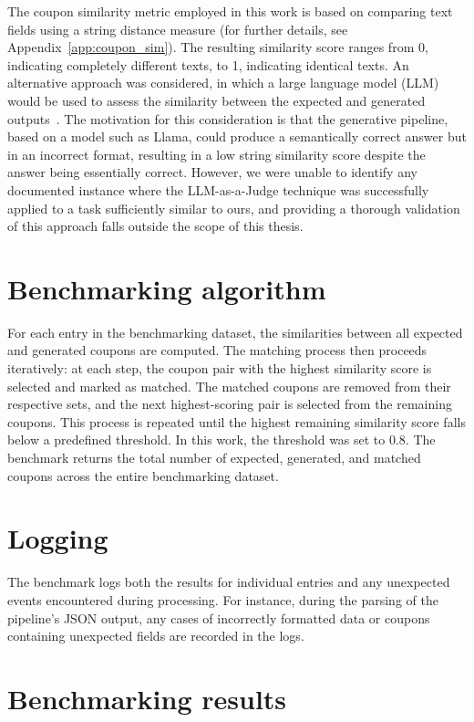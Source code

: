 \documentclass[licencjacka,en]{pracamgr}
\begin{document}
The coupon similarity metric employed in this work is based on comparing text fields using a string distance measure (for further details, see Appendix~\ref{app:coupon_sim}). The resulting similarity score ranges from 0, indicating completely different texts, to 1, indicating identical texts. An alternative approach was considered, in which a large language model (LLM) would be used to assess the similarity between the expected and generated outputs~\cite{llm-as-a-judge}. The motivation for this consideration is that the generative pipeline, based on a model such as Llama, could produce a semantically correct answer but in an incorrect format, resulting in a low string similarity score despite the answer being essentially correct. However, we were unable to identify any documented instance where the LLM-as-a-Judge technique was successfully applied to a task sufficiently similar to ours, and providing a thorough validation of this approach falls outside the scope of this thesis.

\section{Benchmarking algorithm}

For each entry in the benchmarking dataset, the similarities between all expected and generated coupons are computed. The matching process then proceeds iteratively: at each step, the coupon pair with the highest similarity score is selected and marked as matched. The matched coupons are removed from their respective sets, and the next highest-scoring pair is selected from the remaining coupons. This process is repeated until the highest remaining similarity score falls below a predefined threshold. In this work, the threshold was set to 0.8. The benchmark returns the total number of expected, generated, and matched coupons across the entire benchmarking dataset.

\section{Logging}

The benchmark logs both the results for individual entries and any unexpected events encountered during processing. For instance, during the parsing of the pipeline’s JSON output, any cases of incorrectly formatted data or coupons containing unexpected fields are recorded in the logs.

\section{Benchmarking results} \label{benchmarkResults}
\end{document}
